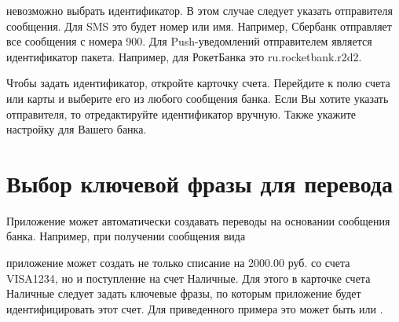 \documentclass[a4paper,10pt,russian]{sphinxmanual}
\begin{document}
невозможно выбрать идентификатор. В этом случае следует указать отправителя сообщения. Для SMS это будет номер или
имя. Например, Сбербанк отправляет все сообщения с номера 900. Для Push-уведомлений отправителем является идентификатор пакета.
Например, для РокетБанка это ru.rocketbank.r2d2.

Чтобы задать идентификатор, откройте карточку счета. Перейдите к полю  счета или карты и выберите его из любого
сообщения банка. Если Вы хотите указать отправителя, то отредактируйте идентификатор вручную.
Также укажите настройку для Вашего банка.

\noindent{}
\noindent{}
\noindent{}
\noindent{}
\noindent{}
\noindent{}


\section{Выбор ключевой фразы для перевода}
\label{\detokenize{account-identities:id2}}
Приложение может автоматически создавать переводы на основании сообщения банка. Например, при получении сообщения вида

\begin{sphinxVerbatim}[commandchars=\\\{\}]
          
\end{sphinxVerbatim}

приложение может создать не только списание на 2000.00 руб. со счета VISA1234, но и поступление на счет Наличные. Для этого в карточке
счета Наличные следует задать ключевые фразы, по которым приложение будет идентифицировать этот счет. Для приведенного примера
это может быть  или .
\end{document}
